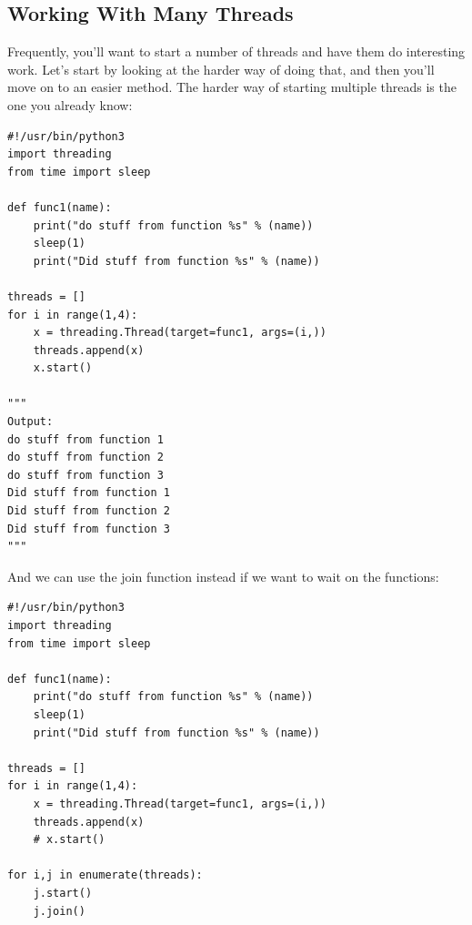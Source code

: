 \documentclass{report}
\begin{document}
    \subsection{Working With Many Threads}
    \bigbreak \noindent 
    Frequently, you’ll want to start a number of threads and have them do interesting work. Let’s start by looking at the harder way of doing that, and then you’ll move on to an easier method.
    \bigbreak \noindent 
    The harder way of starting multiple threads is the one you already know:
    \pagebreak \bigbreak \noindent 
    \begin{mdframed}
        \begin{verbatim}
#!/usr/bin/python3
import threading
from time import sleep

def func1(name):
    print("do stuff from function %s" % (name))
    sleep(1)
    print("Did stuff from function %s" % (name))

threads = []
for i in range(1,4):
    x = threading.Thread(target=func1, args=(i,))
    threads.append(x)
    x.start()

"""
Output:
do stuff from function 1
do stuff from function 2
do stuff from function 3
Did stuff from function 1
Did stuff from function 2
Did stuff from function 3
"""
        \end{verbatim}
    \end{mdframed}
    And we can use the join function instead if we want to wait on the functions:
    \begin{mdframed}
        \begin{verbatim}
#!/usr/bin/python3
import threading
from time import sleep

def func1(name):
    print("do stuff from function %s" % (name))
    sleep(1)
    print("Did stuff from function %s" % (name))

threads = []
for i in range(1,4):
    x = threading.Thread(target=func1, args=(i,))
    threads.append(x)
    # x.start()

for i,j in enumerate(threads):
    j.start()
    j.join()
        \end{verbatim}
    \end{mdframed}

    \pagebreak \bigbreak \noindent 
\end{document}

